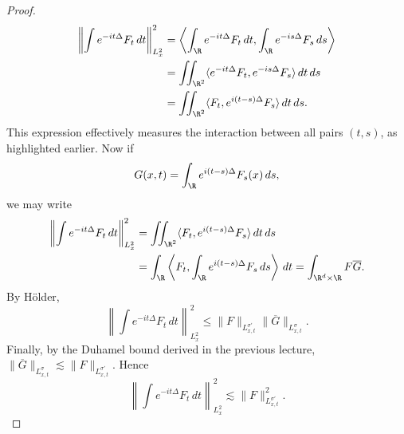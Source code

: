 \begin{proof}
\begin{align*}
\left\|\int e^{-it\Delta}F_t\,dt\right\|_{L^2_x}^2
&=\left\langle\int_\R e^{-it\Delta}F_t\,dt,\int_\R e^{-is\Delta}F_s\,ds\right\rangle\\
&=\iint_{\R^2}\langle e^{-it\Delta}F_t,e^{-is\Delta}F_s\rangle\,dt\,ds\\
&=\iint_{\R^2}\langle F_t,e^{i(t-s)\Delta}F_s\rangle\,dt\,ds.
\end{align*}
This expression effectively measures the interaction between all pairs $(t,s)$, as highlighted earlier. Now if
\[G(x,t)=\int_\R e^{i(t-s)\Delta}F_s(x)\,ds,\]
we may write
\begin{align*}
\left\|\int e^{-it\Delta}F_t\,dt\right\|_{L^2_x}^2
&=\iint_{\R^2}\langle F_t,e^{i(t-s)\Delta}F_s\rangle\,dt\,ds\\
&=\int_\R\left\langle F_t,\int_\R e^{i(t-s)\Delta}F_s\,ds\right\rangle\,dt
=\int_{\R^d\times\R}F\overline G.
\end{align*}
By H\"older,
\[\left\|\int e^{-it\Delta}F_t\,dt\right\|_{L^2_x}^2\leq\|F\|_{L^{\sigma'}_{x,t}}\|\overline G\|_{L^\sigma_{x,t}}.\]
Finally, by the Duhamel bound derived in the previous lecture, $\|\overline G\|_{L^\sigma_{x,t}}\lesssim\|F\|_{L^{\sigma'}_{x,t}}$. Hence
\[\left\|\int e^{-it\Delta}F_t\,dt\right\|_{L^2_x}^2\lesssim\|F\|_{L^{\sigma'}_{x,t}}^2.\]
\end{proof}
